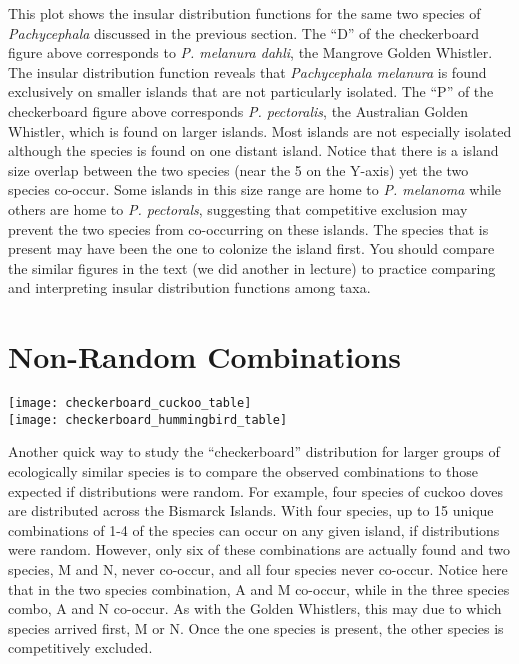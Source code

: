 \documentclass[letterpaper]{tufte-handout}
\begin{document}
This plot shows the insular distribution functions for the same two species of \textit{Pachycephala} discussed in the previous section.   The ``D'' of the checkerboard figure above corresponds to \textit{P. melanura dahli}, the Mangrove Golden Whistler. The insular distribution function reveals that \textit{Pachycephala melanura} is found exclusively on smaller islands that are not particularly isolated. The ``P'' of the checkerboard figure above corresponds \textit{P. pectoralis}, the Australian Golden Whistler, which is found on larger islands.  Most islands are not especially isolated although the species is found on one distant island.  Notice that there is a island size overlap between the two species (near the 5 on the Y-axis) yet the two species co-occur.  Some islands in this size range are home to \textit{P. melanoma} while others are home to \textit{P. pectorals}, suggesting that competitive exclusion may prevent the two species from co-occurring on these islands.  The species that is present may have been the one to colonize the island first.  You should compare the similar figures in the text (we did another in lecture) to practice comparing and interpreting insular distribution functions among taxa.  

\section{Non-Random Combinations}
\begin{marginfigure}
	\texttt{[image: checkerboard\_cuckoo\_table]}\\
	\texttt{[image: checkerboard\_hummingbird\_table]}
\end{marginfigure}

Another quick way to study the ``checkerboard'' distribution for larger groups of ecologically similar species is to compare the observed combinations to those expected if distributions were random.  For example, four species of cuckoo doves are distributed across the Bismarck Islands.  With four species, up to 15 unique combinations of 1-4 of the species can occur on any given island, if distributions were random.  However, only six of these combinations are actually found and two species, M and N, never co-occur, and all four species never co-occur. Notice here that in the two species combination, A and M co-occur, while in the three species combo, A and N co-occur.  As with the Golden Whistlers, this may due to which species arrived first, M or N.  Once the one species is present, the other species is competitively excluded.
\end{document}
